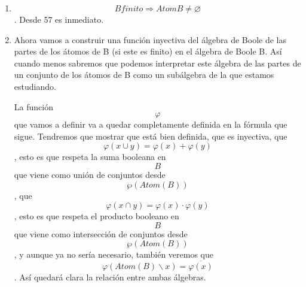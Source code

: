 \begin{enumerate}
\begin{enumerate}
\begin{enumerate}
\begin{enumerate}
      \end{enumerate}
    \item
      \[B\mathit{finito}\Rightarrow\mathit{Atom}{B \neq \varnothing}\].
      Desde 57 es inmediato.
    \item
      Ahora vamos a construir una función inyectiva del álgebra de Boole
      de las partes de los átomos de B (si este es finito) en el álgebra
      de Boole B. Así cuando menos sa\-bremos que podemos interpretar
      este álgebra de las partes de un conjunto de los áto\-mos de B
      como un subálgebra de la que estamos estudiando.

      La función \[\varphi\]que vamos a definir va a quedar
      completamente definida en la fór\-mula que sigue. Tendremos que
      mostrar que está bien definida, que es inyectiva, que
      \[\varphi{{({x \cup y})} = \varphi}{{(x)} + \varphi}{(y)}\], esto
      es que respeta la suma booleana en \[B\]que viene como unión de
      conjuntos desde \[\wp\left( {\mathit{Atom}{(B)}} \right)\], que
      \[\varphi{{({x \cap y})} = \varphi}{{(x)} \cdot \varphi}{(y)}\],
      esto es que respeta el producto booleano en \[B\]que viene como
      intersección de conjun\-tos desde
      \[\wp\left( {\mathit{Atom}{(B)}} \right)\] , y aunque ya no sería
      necesario, también veremos que
      \[\varphi{\left( {\mathit{Atom}{{(B)} \smallsetminus x}} \right) = \overline{\varphi(x)}}\]
      . Así quedará clara la relación entre ambas álgebras.


\end{enumerate}
\end{enumerate}
\end{enumerate}
